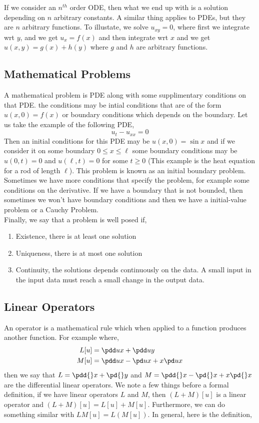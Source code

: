 \noindent
If we consider an $n^{th}$ order ODE, then what we end up with is a solution depending on $n$ arbitrary constants. A similar thing applies to PDEs, but they are $n$ arbitrary functions. To illustate, we solve $u_{xy} = 0$, where first we integrate wrt $y$, and we get $u_x = f(x)$ and then integrate wrt $x$ and we get $u(x, y) = g(x) + h(y)$ where $g$ and $h$ are arbitrary functions.

\subsection{Mathematical Problems}
A mathematical problem is PDE along with some supplimentary conditions on that PDE. the conditions may be intial conditions that are of the form $u(x, 0) = f(x)$ or boundary conditions which depends on the boundary. Let us take the example of the following PDE,
$$ u_t - u_{xx} = 0 $$
Then an initial conditions for this PDE may be $u(x, 0) = \sin x$ and if we consider it on some boundary $0 \le x \le \ell$ some boundary conditions may be $u(0, t) = 0$ and $u(\ell, t) = 0$ for some $t \ge 0$ (This example is the heat equation for a rod of length $\ell$). This problem is known as an initial boundary problem. Sometimes we have more conditions that specify the problem, for example some conditions on the derivative. If we have a boundary that is not bounded, then sometimes we won't have boundary conditions and then we have a initial-value problem or a Cauchy Problem. \\

\noindent
Finally, we say that a problem is well posed if,
\begin{enumerate}
  \item Existence, there is at least one solution
  \item Uniqueness, there is at most one solution
  \item Continuity, the solutions depends continuously on the data. A small input in the input data must reach a small change in the output data.
\end{enumerate}

\subsection{Linear Operators}
An operator is a mathematical rule which when applied to a function produces another function. For example where,
\begin{align*}
  L[u] &= \pdd u x + \pdd u y\\
  M[u] &= \pdd u x - \pd u x + x\pd u x
\end{align*}
then we say that $L = \pdd {} x + \pd {} y$ and $M = \pdd {} x - \pd {} x + x\pd {} x$ are the differential linear operators. We note a few things before a formal definition, if we have linear operators $L$ and $M$, then $(L + M)[u]$ is a linear operator and $(L + M)[u] = L[u] + M[u]$. Furthermore, we can do something similar with $LM[u] = L(M[u])$. In general, here is the definition,

